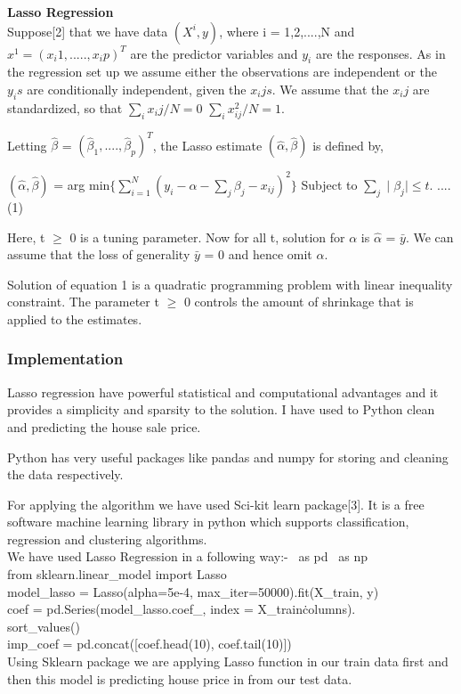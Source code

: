 \documentclass[fleqn,10pt]{SelfArx} %
\begin{document}
\textbf{Lasso Regression} \\ Suppose[2] that we have data $(X^i,y)$, where i = 1,2,....,N and $x^1 = (x_i1,....., x_ip)^T$ are the predictor variables and $y_i$ are the responses. As in the regression set up we assume either the observations are independent or the $y_i s$ are conditionally independent, given the $x_ij s$. We assume that the $x_ij$ are standardized, so that $\sum_i x_ij/N = 0$ $\sum_i x_{ij}^{2}/N = 1$.

Letting $\hat{\beta}$ = $(\hat{\beta}_1,...., \hat{\beta}_p )^T$, the Lasso estimate $(\hat{\alpha}, \hat{\beta})$ is defined by,

$(\hat{\alpha}, \hat{\beta})$ = arg min$\{\sum_{i=1}^{N}(y_i - \alpha - \sum_j \beta_j - x_{ij} )^2\}$ Subject to $\sum_j \mid \beta_j \mid \leq t.$  .... (1)

Here, t $\geq$ 0 is a tuning parameter. Now for all t, solution for $\alpha$ is $\hat{\alpha}$ = $\bar{y}$. We can assume that the loss of generality $\bar{y}$ = 0 and hence omit $\alpha$.

Solution of equation 1 is a quadratic programming problem with linear inequality constraint. The parameter t $\geq$ 0 controls the amount of shrinkage that is applied to the estimates. 

\subsubsection{Implementation}
Lasso regression have powerful statistical and computational advantages and it provides a simplicity and sparsity to the solution. 
I have used to Python clean and predicting the house sale price. 

Python has very useful packages like pandas and numpy for storing and cleaning the data respectively.

For applying the algorithm we have used Sci-kit learn package[3]. It is a free software machine learning library in python which supports classification, regression and clustering algorithms. 
\\We have used Lasso Regression in a following way:-
\ as pd
\ as np
\\from sklearn$.$linear\_model import Lasso
\\model\_lasso = Lasso(alpha=5e-4, max\_iter=50000)$.$fit(X\_train, y)
\\coef = pd.Series(model\_lasso.coef\_, index = X\_train\.columns).\\ sort\_values()
\\imp\_coef = pd.concat([coef.head(10), coef$.$tail(10)])
\\Using Sklearn package we are applying Lasso function in our train data first and then this model is predicting house price in from our test data.
\end{document}

